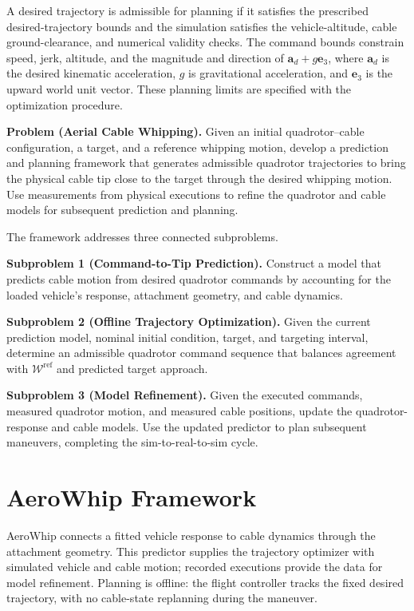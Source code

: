 \documentclass[letterpaper, 10 pt, conference]{ieeeconf}
\begin{document}
A desired trajectory is admissible for planning if it satisfies
the prescribed desired-trajectory bounds and the simulation
satisfies the vehicle-altitude, cable ground-clearance, and
numerical validity checks. The command bounds constrain speed,
jerk, altitude, and the magnitude and direction of
$\mathbf{a}_d+g\mathbf{e}_3$, where $\mathbf{a}_d$ is the desired
kinematic acceleration, $g$ is gravitational acceleration, and
$\mathbf{e}_3$ is the upward world unit vector.
These planning limits are specified with the optimization procedure.

\noindent\textbf{Problem (Aerial Cable Whipping).}
Given an initial quadrotor--cable configuration, a target, and a
reference whipping motion, develop a prediction and planning
framework that generates admissible quadrotor trajectories
to bring the physical cable tip close to the target through
the desired whipping motion. Use measurements from physical
executions to refine the quadrotor and cable models for
subsequent prediction and planning.

The framework addresses three connected subproblems.

\noindent\textbf{Subproblem 1 (Command-to-Tip Prediction).}
Construct a model that predicts cable motion from desired
quadrotor commands by accounting for the loaded vehicle's
response, attachment geometry, and cable dynamics.

\noindent\textbf{Subproblem 2 (Offline Trajectory Optimization).}
Given the current prediction model, nominal initial condition,
target, and targeting interval, determine an admissible
quadrotor command sequence that balances agreement with
$\mathcal{W}^{\mathrm{ref}}$ and predicted target approach.

\noindent\textbf{Subproblem 3 (Model Refinement).}
Given the executed commands, measured quadrotor motion, and
measured cable positions, update the quadrotor-response and
cable models. Use the updated predictor to plan subsequent
maneuvers, completing the sim-to-real-to-sim cycle.

\section{AeroWhip Framework}
\label{sec:aerowhip_framework}

AeroWhip connects a fitted vehicle response to cable dynamics
through the attachment geometry. This predictor supplies the
trajectory optimizer with simulated vehicle and cable motion;
recorded executions provide the data for model refinement.
Planning is offline: the flight controller tracks the fixed desired
trajectory, with no cable-state replanning during the maneuver.
\end{document}
